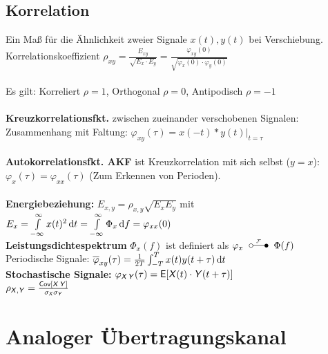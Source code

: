\documentclass[fs, footer]{latex4ei}
\begin{document}
\begin{multicols*}{4}
{\subsection{Korrelation}
Ein Maß für die Ähnlichkeit zweier Signale $x(t), y(t)$ bei Verschiebung.\\
Korrelationskoeffizient $\rho_{xy} = \frac{E_{xy}}{\sqrt{E_x \cdot E_y}} = \frac{\varphi_{xy}(0)}{ \sqrt{\varphi_x(0) \cdot \varphi_y(0)}}$\\
\\
Es gilt: Korreliert $\rho = 1$, Orthogonal $\rho = 0$, Antipodisch $\rho = -1$\\
\\
\textbf{Kreuzkorrelationsfkt.} zwischen zueinander verschobenen Signalen:\\
	Zusammenhang mit Faltung: $\varphi_{xy} (\tau) = x(-t) * y(t)|_{t = \tau}$\\
	\\
\textbf{Autokorrelationsfkt. AKF} ist Kreuzkorrelation mit sich selbst ($y = x$):\\
$\varphi_x (\tau) = \varphi_{xx}(\tau)$ \qquad (Zum Erkennen von Perioden).\\ 
\\
\textbf{Energiebeziehung:} $E_{x,y} = \rho_{x,y} \sqrt{E_x E_y}$ mit \\
$E_x = \int\limits_{- \infty}^{\infty} x(t)^2 \diff t = \int\limits_{- \infty}^{\infty} \Phi_x \diff f = \varphi_{xx}(0)$\\
\textbf{Leistungsdichtespektrum} $\Phi_x(f)$ ist definiert als $\varphi_x \FT \Phi(f)$\\

Periodische Signale: $\overline \varphi_{xy}(\tau) = \frac{1}{2T} \int_{-T}^{T} x(t) y(t+\tau) \diff t$\\
\textbf{Stochastische Signale:} $\varphi_{\operatorname{\textsf{\textit{X}}}\operatorname{\textsf{\textit{Y}}}}(\tau) = \operatorname{\textsf{E}}[\operatorname{\textsf{\textit{X}}}(t) \cdot \operatorname{\textsf{\textit{Y}}}(t+\tau)]$\\
$\rho_{\operatorname{\textsf{\textit{X}}},\operatorname{\textsf{\textit{Y}}}} = \frac{\operatorname{\textsf{Cov}}[\operatorname{\textsf{\textit{X}}} \operatorname{\textsf{\textit{Y}}}]}{\sigma_{\operatorname{\textsf{\textit{X}}}} \sigma_{\operatorname{\textsf{\textit{Y}}}}}$\\
}




\section{Analoger Übertragungskanal}







\end{multicols*}
\end{document}

